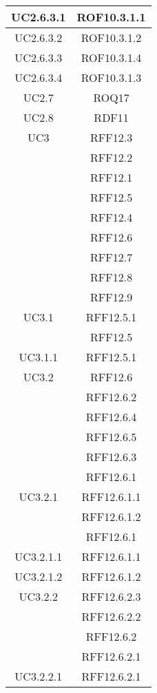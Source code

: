 \begin{longtable}{|c|c|}
\midrule
UC2.6.3.1
& ROF10.3.1.1\\

\midrule
UC2.6.3.2
& ROF10.3.1.2\\

\midrule
UC2.6.3.3
& ROF10.3.1.4\\

\midrule
UC2.6.3.4
& ROF10.3.1.3\\

\midrule
UC2.7
& ROQ17\\

\midrule
UC2.8
& RDF11\\

\midrule
UC3
& RFF12.3\\
& RFF12.2\\
& RFF12.1\\
& RFF12.5\\
& RFF12.4\\
& RFF12.6\\
& RFF12.7\\
& RFF12.8\\
& RFF12.9\\

\midrule
UC3.1
& RFF12.5.1\\
& RFF12.5\\

\midrule
UC3.1.1
& RFF12.5.1\\

\midrule
UC3.2
& RFF12.6\\
& RFF12.6.2\\
& RFF12.6.4\\
& RFF12.6.5\\
& RFF12.6.3\\
& RFF12.6.1\\

\midrule
UC3.2.1
& RFF12.6.1.1\\
& RFF12.6.1.2\\
& RFF12.6.1\\

\midrule
UC3.2.1.1
& RFF12.6.1.1\\

\midrule
UC3.2.1.2
& RFF12.6.1.2\\

\midrule
UC3.2.2
& RFF12.6.2.3\\
& RFF12.6.2.2\\
& RFF12.6.2\\
& RFF12.6.2.1\\

\midrule
UC3.2.2.1
& RFF12.6.2.1\\


\end{longtable}
